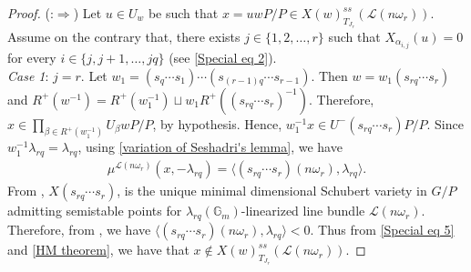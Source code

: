 \documentclass[12pt,reqno]{amsart}
\numberwithin{equation}{section}
\theoremstyle{definition}
\begin{document}
\begin{proof}
(:$\Rightarrow$)	Let $u\in U_{w}$ be such that $x=uwP/P\in X(w)^{ss}_{T_{J_{r}}}(\mathcal{L}(n\omega_{r}))$. Assume on the contrary that, there exists $j\in\{1,2,\ldots,r\}$ such that $X_{\alpha_{i,j}}(u)=0$ for every $i\in\{j,j+1,\ldots,jq\}$ (see \cref{Special eq 2}).\\
	{\it{Case 1}}: $j=r$. Let $w_{1}=(s_{q}\cdots s_{1})\cdots (s_{(r-1)q}\cdots s_{r-1})$. Then $w=w_{1}(s_{rq}\cdots s_{r})$ and $R^{+}(w^{-1})=R^{+}(w_{1}^{-1})\sqcup w_{1}R^{+}((s_{rq}\cdots s_{r})^{-1})$. Therefore, $x\in \prod_{\beta\in R^{+}(w_{1}^{-1})}U_{\beta}wP/P$, by hypothesis. Hence, $w_{1}^{-1}x\in U^{-}(s_{rq}\cdots s_{r})P/P$. Since $w_{1}^{-1}\lambda_{rq}=\lambda_{rq}$, using \cref{variation of Seshadri's lemma}, we have 
	\begin{align}\label{Special eq 5}
		\mu^{\mathcal{L}(n\omega_{r})}(x,-\lambda_{rq})=\langle (s_{rq}\cdots s_{r})(n\omega_{r}),\lambda_{rq}\rangle.
	\end{align}
From \cite[Lemma 5.8]{GKgit}, $X(s_{rq}\cdots s_{r})$, is the unique minimal dimensional Schubert variety in $G/P$ admitting semistable points for $\lambda_{rq}(\mathbb{G}_{m})$-linearized line bundle $\mathcal{L}(n\omega_{r})$. Therefore, from \cite[Lemma 5.4]{GKgit}, we have $\langle (s_{rq}\cdots s_{r})(n\omega_{r}),\lambda_{rq}\rangle<0$. Thus from \cref{Special eq 5} and \cref{HM theorem}, we have that $x\notin X(w)^{ss}_{T_{J_{r}}}(\mathcal{L}(n\omega_{r}))$.


\end{proof}
\end{document}
